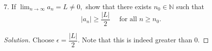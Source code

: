 \documentclass[12pt]{article}
\theoremstyle{definition}
\newenvironment{blockquote}
{\begin{mdframed}[skipabove=0pt, skipbelow=0pt, innertopmargin=4pt, innerbottommargin=4pt, bottomline=false,topline=false,rightline=false, linewidth=2pt]}
{\end{mdframed}}
\newenvironment{soln}{\begin{proof}[Solution]}{\end{proof}}
\begin{document}
\begin{itemize}[leftmargin=*]
\begin{soln}
\begin{blockquote}
\begin{proof}
		By principle of mathematical induction, we have proven the claim. 
	\end{proof}
	\end{blockquote}
	\phantom{hi}
	\begin{blockquote}
	Claim 2. $a_n < a_{n+1}$ for all $n \in \mathbb{N}.$ 
	\begin{proof} 
		$a_{n+1} - a_n = 3 - \dfrac{a_n}{2} = \dfrac{6 - a_n}{2} > 0 \implies a_{n+1} > a_n.$ 
	\end{proof}
	\end{blockquote}

	Thus, we now know that the sequence converges. Let $L = \lim_{n\to \infty}a_n.$ Then taking the limit on both sides of
	\begin{equation*} 
		a_{n+1} = 3 + \dfrac{a_n}{2}
	\end{equation*}
	gives us
	\begin{equation*} 
		L = 3 + \dfrac{L}{2},
	\end{equation*}
	which we can solve to get $L = 6.$
	\end{soln}
	\newpage	
	\item[7.] If $\displaystyle\lim_{n\to \infty}a_n = L \neq 0,$ show that there exists $n_0 \in \mathbb{N}$ such that
    \begin{equation*} 
    	|a_n| \ge \dfrac{|L|}{2} \quad \text{ for all } n \ge n_0.
    \end{equation*}

    \begin{soln}
    	Choose $\epsilon = \dfrac{\left|L\right|}{2}.$ Note that this is indeed greater than $0.$


\end{soln}
\end{itemize}
\end{document}
